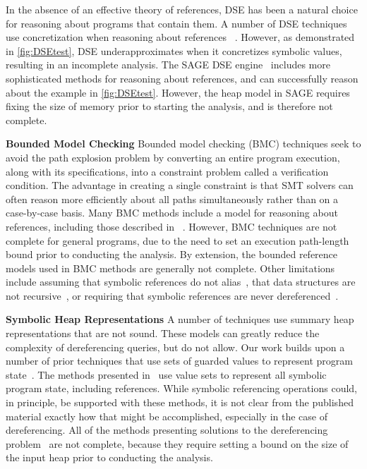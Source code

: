 In the absence of an effective theory of references, DSE has been a natural choice for reasoning about programs that contain them. A number of DSE techniques use concretization when reasoning about references ~\cite{Godefroid:2005,Sen:2005,Godefroid:POPL07,Tillmann:2008}. However, as demonstrated in \ref{fig:DSEtest}, DSE underapproximates when it concretizes symbolic values, resulting in an incomplete analysis. The SAGE DSE engine~\cite{Elkarablieh:2009} includes more sophisticated methods for reasoning about references, and can successfully reason about the example in \ref{fig:DSEtest}. However, the heap model in SAGE requires fixing the size of memory prior to starting the analysis, and is therefore not complete. 

\noindent\textbf{Bounded Model Checking}
Bounded model checking (BMC) techniques seek to avoid the path explosion problem by converting an entire program execution, along with its specifications, into a constraint problem called a verification condition. The advantage in creating a single constraint is that SMT solvers can often reason more efficiently about all paths simultaneously rather than on a case-by-case basis. Many BMC methods include a model for reasoning about references, including those described in ~\cite{Clarke:2004,Barnett:2006,Xie:2005,Babic:2007,Dillig:2011}. However, BMC techniques are not complete for general programs, due to the need to set an execution path-length bound prior to conducting the analysis. By extension, the bounded reference models used in BMC methods are generally not complete. Other limitations include assuming that symbolic references do not alias~\cite{Xie:2005,Babic:2007}, that data structures are not recursive~\cite{Dillig:2011}, or requiring that symbolic references are never dereferenced~\cite{Clarke:2004}.

\noindent\textbf{Symbolic Heap Representations}
A number of techniques use summary heap representations that are not sound. These models can greatly reduce the complexity of dereferencing queries, but do not allow.
Our work builds upon a number of prior techniques that use sets of guarded values to represent program state~\cite{Sen:2014,Torlak:2014,Yorsh:2008,Xie:2005,Dillig:2011,Elkarablieh:2009}. The methods presented in~\cite{Sen:2014,Torlak:2014,Yorsh:2008} use value sets to represent all symbolic program state, including references. While symbolic referencing operations could, in principle, be supported with these methods, it is not clear from the published material exactly how that might be accomplished, especially in the case of dereferencing. All of the methods presenting solutions to the dereferencing problem~\cite{Xie:2005,Dillig:2011,Elkarablieh:2009} are not complete, because they require setting a bound on the size of the input heap prior to conducting the analysis.

